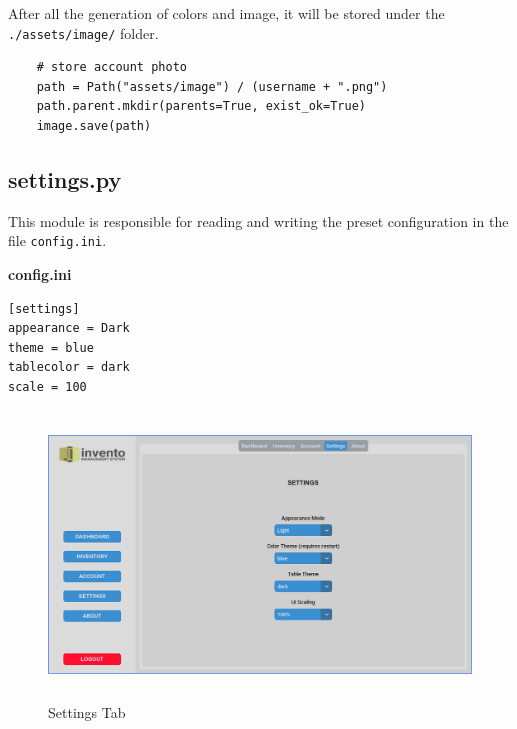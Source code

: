 \documentclass[12pt,a4paper]{article}
\begin{document}
            After all the generation of colors and image, it will be stored under 
            the \texttt{./assets/image/} folder.

\begin{lstlisting}
    # store account photo
    path = Path("assets/image") / (username + ".png")
    path.parent.mkdir(parents=True, exist_ok=True)
    image.save(path)
\end{lstlisting}


        \subsection*{\normalfont{\faCode{}} \textbf{settings.py}}

            This module is responsible for reading and writing the preset 
            configuration in the file \texttt{config.ini}.

            \hfill{}

            \faFile{} \textbf{config.ini}
            \begin{lstlisting}
[settings]
appearance = Dark
theme = blue
tablecolor = dark
scale = 100
            \end{lstlisting}

            \begin{figure}[ht]
              \centering
              \includegraphics[width=5in,height=3in]{lightsettings.png}
              \caption{Settings Tab}
              \label{fig:lightsettings}
            \end{figure}
\end{document}
